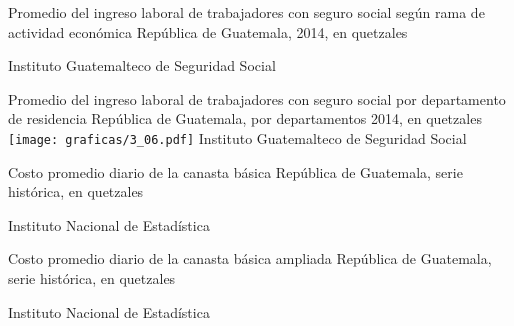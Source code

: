 
%
{%
}%
{%
	Promedio del ingreso laboral de trabajadores con seguro social según rama de actividad económica} %
{%
	República de Guatemala, 2014, en quetzales } %
{%
	\begin{tikzpicture}[x=1pt,y=1pt]    \end{tikzpicture}}%
{%
	Instituto Guatemalteco de Seguridad Social} %

  
  {%
  }%
  {%
  	Promedio del ingreso laboral de trabajadores con seguro social por departamento de residencia
  } %
  {%
  	República de Guatemala, por departamentos 2014, en quetzales} %
  {%
  	\texttt{[image: graficas/3\_06.pdf]}}%
  {%
  	Instituto Guatemalteco de Seguridad Social} %


%
{%
}%
{%
Costo promedio diario de la canasta básica } %
{%
	República de Guatemala, serie histórica, en quetzales } %
{%
	\begin{tikzpicture}[x=1pt,y=1pt]    \end{tikzpicture}}%
{%
	Instituto Nacional de Estadística} %


%
{%
}%
{%
	Costo promedio diario de la canasta básica ampliada } %
{%
	República de Guatemala, serie histórica, en quetzales } %
{%
	\begin{tikzpicture}[x=1pt,y=1pt]    \end{tikzpicture}}%
{%
	Instituto Nacional de Estadística} %
